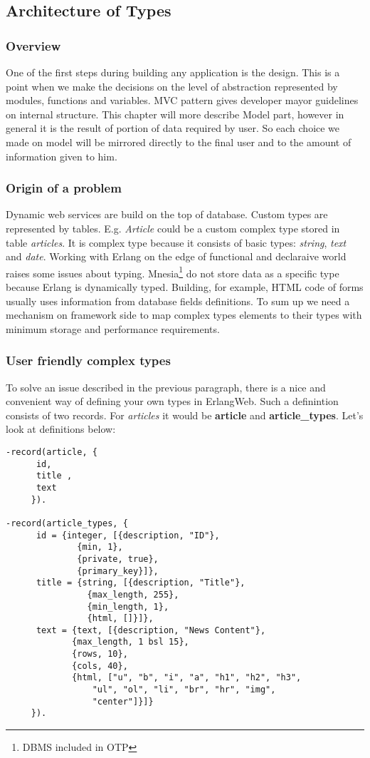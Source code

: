 \subsection{Architecture of Types}
\subsubsection{Overview}
One of the first steps during building any application is the design. This is a
point when we make the decisions on the level of abstraction represented by modules,
functions and variables.
MVC pattern gives developer mayor guidelines on internal structure. This
chapter will more  describe Model part, however in general it is the result of portion of data
required by user.
So each choice we made on model will be mirrored directly to the final user and
to the amount of information given to him.
\subsubsection{Origin of a problem}
Dynamic web services are build on the top of database. Custom types are
represented by tables. E.g. \emph{Article} could be a custom complex type stored
in table {\it articles}. It is complex type because it consists of basic types: {\it string}, {\it text} and {\it date}. 
Working with Erlang on the edge of functional and declaraive world 
 raises some issues about typing. Mnesia\footnote{DBMS included in OTP} do
 not store data as a specific type because Erlang is dynamically typed. Building, for
 example, HTML code of forms usually uses information from database fields
definitions. 
To sum up we need a mechanism on framework side to map complex types elements
to their types with minimum storage and performance requirements. 
\subsubsection{User friendly complex types}
To solve an issue described in the previous paragraph, there is a nice and
convenient way of defining your own types in ErlangWeb. Such a definintion
consists of two records. For {\it articles} it would be \textbf{article} and
\textbf{article\_types}. Let's look at definitions below:
\begin{Verbatim}
-record(article, {
	  id,
	  title ,
	  text
	 }).

-record(article_types, {
	  id = {integer, [{description, "ID"},
			  {min, 1},
			  {private, true}, 
			  {primary_key}]},
	  title = {string, [{description, "Title"},
			    {max_length, 255},
			    {min_length, 1},
			    {html, []}]},
	  text = {text, [{description, "News Content"},
			 {max_length, 1 bsl 15},
			 {rows, 10},
			 {cols, 40},
			 {html, ["u", "b", "i", "a", "h1", "h2", "h3",
				 "ul", "ol", "li", "br", "hr", "img",
				 "center"]}]}
	 }). 
\end{Verbatim}

